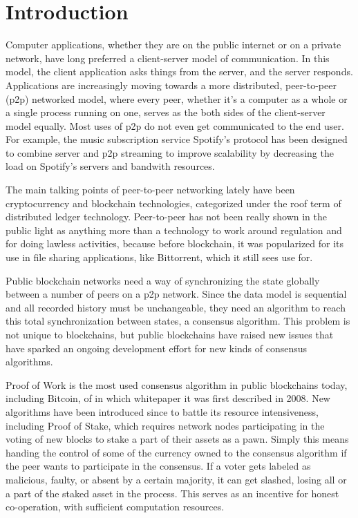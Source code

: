 \chapter{Introduction}
\label{Introduction}

Computer applications, whether they are on the public internet or on a private network, have long preferred a client-server model of communication. In this model, the client application asks things from the server, and the server responds. Applications are increasingly moving towards a more distributed, peer-to-peer (p2p) networked model, where every peer, whether it's a computer as a whole or a single process running on one, serves as the both sides of the client-server model equally. Most uses of p2p do not even get communicated to the end user. For example, the music subscription service Spotify's protocol has been designed to combine server and p2p streaming to improve scalability by decreasing the load on Spotify's servers and bandwith resources.\cite{spotify} 

The main talking points of peer-to-peer networking lately have been cryptocurrency and blockchain technologies, categorized under the roof term of distributed ledger technology. Peer-to-peer has not been really shown in the public light as anything more than a technology to work around regulation and for doing lawless activities, because before blockchain, it was popularized for its use in file sharing applications, like Bittorrent, which it still sees use for. 

Public blockchain networks need a way of synchronizing the state globally between a number of peers on a p2p network. Since the data model is sequential and all recorded history must be unchangeable, they need an algorithm to reach this total synchronization between states, a consensus algorithm. This problem is not unique to blockchains, but public blockchains have raised new issues that have sparked an ongoing development effort for new kinds of consensus algorithms.

Proof of Work is the most used consensus algorithm in public blockchains today, including Bitcoin, of in which whitepaper it was first described in 2008.\cite{nakamoto} New algorithms have been introduced since to battle its resource intensiveness, including Proof of Stake, which requires network nodes participating in the voting of new blocks to stake a part of their assets as a pawn. Simply this means handing the control of some of the currency owned to the consensus algorithm if the peer wants to participate in the consensus. If a voter gets labeled as malicious, faulty, or absent by a certain majority, it can get slashed, losing all or a part of the staked asset in the process. This serves as an incentive for honest co-operation, with sufficient computation resources.

